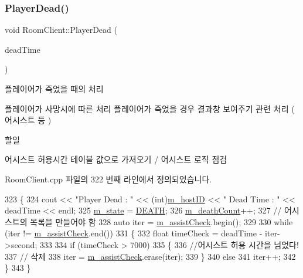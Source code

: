 \subsubsection{\texorpdfstring{Player\+Dead()}{PlayerDead()}}
{\footnotesize\ttfamily void Room\+Client\+::\+Player\+Dead (\begin{DoxyParamCaption}\item[{float}]{dead\+Time }\end{DoxyParamCaption})}



플레이어가 죽었을 때의 처리 

플레이어가 사망시에 따른 처리  플레이어가 죽었을 경우 결과창 보여주기 관련 처리 ( 어시스트 등 )

\begin{DoxyRefDesc}{할일}
\item[\hyperlink{todo__todo000002}{할일}]어시스트 허용시간 테이블 값으로 가져오기 / 어시스트 로직 점검 \end{DoxyRefDesc}


Room\+Client.\+cpp 파일의 322 번째 라인에서 정의되었습니다.


\begin{DoxyCode}
323 \{
324     cout << \textcolor{stringliteral}{"Player Dead : "} << (int)\hyperlink{class_room_client_a44db06515969e9ef7d4fad346bc01a7c}{m\_hostID} << \textcolor{stringliteral}{" Dead Time : "} << deadTime << endl;
325     \hyperlink{class_room_client_a247e5deb46a11e0d1a0e8e9029d87d54}{m\_state} = \hyperlink{stdafx_8h_a3c730f37b1b3a893159bada67637fdb1aa65c1c1f61d319e66a6269441cdcbd71}{DEATH};
326     \hyperlink{class_room_client_a4427d3725926876237d44ae4b088c57f}{m\_deathCount}++;
327     \textcolor{comment}{// 어시스트의 목록을 만들어야 함}
328     \textcolor{keyword}{auto} iter = \hyperlink{class_room_client_a9f63a98f8a902a52bf272f23af3e5f82}{m\_assistCheck}.begin();
329 
330     \textcolor{keywordflow}{while} (iter != \hyperlink{class_room_client_a9f63a98f8a902a52bf272f23af3e5f82}{m\_assistCheck}.end())
331     \{
332         \textcolor{keywordtype}{float} timeCheck = deadTime - iter->second;
333 
334         \textcolor{keywordflow}{if} (timeCheck > 7000)
335         \{
336             \textcolor{comment}{//어시스트 허용 시간을 넘었다!}
337             \textcolor{comment}{// 삭제}
338             iter = \hyperlink{class_room_client_a9f63a98f8a902a52bf272f23af3e5f82}{m\_assistCheck}.erase(iter);
339         \}
340         \textcolor{keywordflow}{else}
341             iter++;
342     \}
343 \}
\end{DoxyCode}
\mbox{\label{class_room_client_aab61bfaebafc8159336c3ec72aa21758}} 
